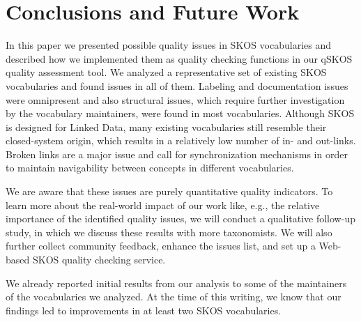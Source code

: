 \section{Conclusions and Future Work}\label{sec:conclusions}

In this paper we presented possible quality issues in SKOS vocabularies and described how we implemented them as quality checking functions in our qSKOS quality assessment tool. We analyzed a representative set of existing SKOS vocabularies and found  issues in all of them. Labeling and documentation issues were omnipresent and also structural issues, which require further investigation by the vocabulary maintainers, were found in most vocabularies. Although SKOS is designed for Linked Data, many existing vocabularies still resemble their closed-system origin, which results in a relatively low number of in- and out-links. Broken links are a major issue and call for synchronization mechanisms in order to maintain navigability between concepts in different vocabularies.

We are aware that these issues are purely quantitative quality indicators. To learn more about the real-world impact of our work like, e.g., the relative importance of the identified quality issues, we will conduct a qualitative follow-up study, in which we discuss these results with more taxonomists. We will also further collect community feedback, enhance the issues list, and set up a Web-based SKOS quality checking service.

We already reported initial results from our analysis to some of the maintainers of the vocabularies we analyzed. At the time of this writing, we know that our findings led to improvements in at least two SKOS vocabularies.
